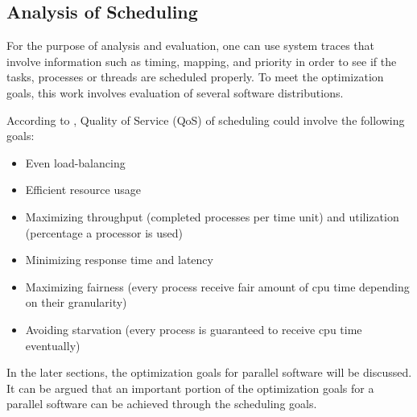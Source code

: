 \subsection{Analysis of Scheduling}\label{schedulingsection}%
For the purpose of analysis and evaluation, one can use system traces that involve information such as timing, mapping, and priority in order to see if the tasks, processes or threads are scheduled properly. To meet the optimization goals, this work involves evaluation of several software distributions. 

According to \cite{lukas1}, Quality of Service (QoS) of scheduling could involve the following goals:
\begin{itemize}
	\item Even load-balancing
	\item Efficient resource usage 
	\item Maximizing throughput (completed processes per time unit) and utilization (percentage a processor is used)
	\item Minimizing response time and latency
	\item Maximizing fairness (every process receive fair amount of cpu time depending on their granularity)
	\item Avoiding starvation (every process is guaranteed to receive cpu time eventually)
\end{itemize}
In the later sections, the optimization goals for parallel software will be discussed. It can be argued that an important portion of the optimization goals for a parallel software can be achieved through the scheduling goals.

